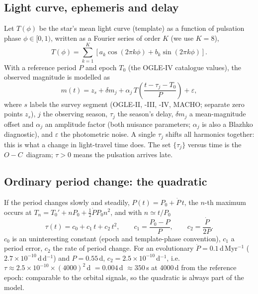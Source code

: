 \documentclass[11pt]{article}
\newcommand{\OC}{\ensuremath{O{-}C}}
\newcommand{\Pdot}{\ensuremath{\dot P}}
\begin{document}
\subsection{Light curve, ephemeris and delay}
Let $T(\phi)$ be the star's mean light curve (template) as a function of pulsation phase $\phi\in[0,1)$, written as a
Fourier series of order $K$ (we use $K=8$),
\begin{equation}
T(\phi)=\sum_{k=1}^{K}\left[a_k\cos(2\pi k\phi)+b_k\sin(2\pi k\phi)\right].
\end{equation}
With a reference period $P$ and epoch $T_0$ (the OGLE-IV catalogue values), the observed magnitude is modelled as
\begin{equation}\label{eq:lc}
m(t)=z_s+\delta m_j+\alpha_j\,T\!\left(\frac{t-\tau_j-T_0}{P}\right)+\varepsilon ,
\end{equation}
where $s$ labels the survey segment (OGLE-II, -III, -IV, MACHO; separate zero points $z_s$), $j$ the observing season,
$\tau_j$ the season's delay, $\delta m_j$ a mean-magnitude offset and $\alpha_j$ an amplitude factor (both nuisance
parameters; $\alpha_j$ is also a Blazhko diagnostic), and $\varepsilon$ the photometric noise. A single $\tau_j$ shifts all
harmonics together: this is what a change in light-travel time does. The set $\{\tau_j\}$ versus time is the
\OC\ diagram; $\tau>0$ means the pulsation arrives late.

\subsection{Ordinary period change: the quadratic}
If the period changes slowly and steadily, $P(t)=P_0+\Pdot\,t$, the $n$-th maximum occurs at
$T_n=T_0'+nP_0+\tfrac12\Pdot P_0 n^2$, and with $n\simeq t/P_0$
\begin{equation}\label{eq:quad}
\tau(t)=c_0+c_1\,t+c_2\,t^2,\qquad c_1=\frac{P_0-P}{P},\qquad c_2=\frac{\Pdot}{2P}.
\end{equation}
$c_0$ is an uninteresting constant (epoch and template-phase convention), $c_1$ a period error, $c_2$ the rate of
period change. For an evolutionary $\Pdot=0.1$\,d\,Myr$^{-1}$ ($2.7\times10^{-10}$\,d\,d$^{-1}$) and $P=0.55$\,d,
$c_2=2.5\times10^{-10}$\,d$^{-1}$, i.e.\ $\tau\approx2.5\times10^{-10}\times(4000)^2$\,d $=0.004$\,d $\approx350$\,s
at 4000\,d from the reference epoch: comparable to the orbital signals, so the quadratic is always part of the model.
\end{document}
